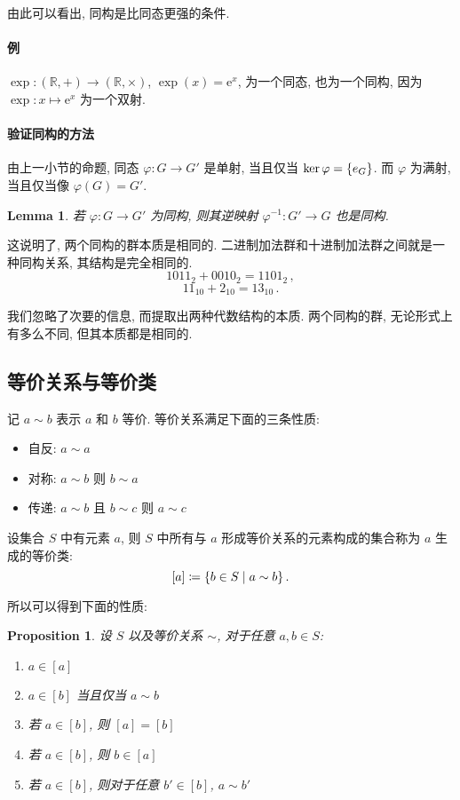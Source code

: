 \documentclass[UTF8]{ctexart}
\theoremstyle{mystyle}
\newtheorem{lemma}{Lemma}[section]
\newtheorem{proposition}{Proposition}[section]
\theoremstyle{myremark}
\theoremstyle{plain}
\newcommand{\mr}{\mathrm}
\newcommand{\R}{\mathbb R}
\DeclarePairedDelimiter\set{\{}{\}}
\begin{document}
由此可以看出, 同构是比同态更强的条件.

\paragraph{例}
$ \exp \colon (\R, +) \to (\R, \times) $, $ \exp(x) = \mr e^x $, 为一个同态, 也为一个同构, 因为 $ \exp \colon x \mapsto \mr e^x $ 为一个双射.

\paragraph{验证同构的方法}
由上一小节的命题, 同态 $ \varphi \colon G \to G' $ 是单射, 当且仅当 $ \ker \varphi = \set{e_G} $. 而 $ \varphi $ 为满射, 当且仅当像 $ \varphi(G) = G' $.

\begin{lemma}
    若 $ \varphi \colon G \to G' $ 为同构, 则其逆映射 $ \varphi^{-1} \colon G' \to G $ 也是同构.
\end{lemma}

这说明了, 两个同构的群本质是相同的. 二进制加法群和十进制加法群之间就是一种同构关系, 其结构是完全相同的.
\[ 1011_2 + 0010_2 = 1101_2 \,,\]
\[ 11_{10} + 2_{10} = 13_{10} \,.\]

我们忽略了次要的信息, 而提取出两种代数结构的本质. 两个同构的群, 无论形式上有多么不同, 但其本质都是相同的.


\subsection{等价关系与等价类}
记 $ a \sim b $ 表示 $ a $ 和 $ b $ 等价. 等价关系满足下面的三条性质:
\begin{itemize}
    \item 自反: $ a \sim a $
    \item 对称: $ a \sim b $ 则 $ b \sim a $
    \item 传递: $ a \sim b $ 且 $ b \sim c $ 则 $ a \sim c $
\end{itemize}

\begin{definition}
    设集合 $ S $ 中有元素 $ a $, 则 $ S $ 中所有与 $ a $ 形成等价关系的元素构成的集合称为 $ a $ 生成的等价类:
    \[ [a] \coloneqq \set{b \in S \mid a \sim b} \,.\]
\end{definition}

所以可以得到下面的性质:
\begin{proposition}
    设 $ S $ 以及等价关系 $ \sim $, 对于任意 $ a, b \in S $:
    \begin{enumerate}
        \item $ a \in [a] $
        \item $ a \in [b] $ 当且仅当 $ a \sim b $
        \item 若 $ a \in [b] $, 则 $ [a] = [b] $
        \item 若 $ a \in [b] $, 则 $ b \in [a] $
        \item 若 $ a \in [b] $, 则对于任意 $ b' \in [b] $, $ a \sim b' $
    \end{enumerate}
\end{proposition}
\end{document}
